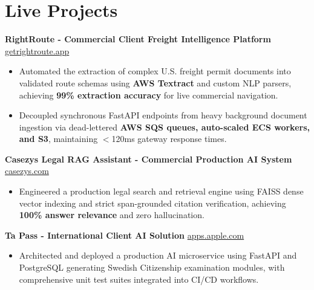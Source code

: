 \documentclass[9.5pt,a4paper]{article}
\begin{document}
\section*{Live Projects}
\noindent
\textbf{RightRoute - Commercial Client Freight Intelligence Platform} \hfill \href{https://getrightroute.app}{getrightroute.app}
\begin{itemize}
    \item Automated the extraction of complex U.S. freight permit documents into validated route schemas using \textbf{AWS Textract} and custom NLP parsers, achieving \textbf{99\% extraction accuracy} for live commercial navigation.
    \item Decoupled synchronous FastAPI endpoints from heavy background document ingestion via dead-lettered \textbf{AWS SQS queues, auto-scaled ECS workers, and S3}, maintaining $<$120ms gateway response times.
\end{itemize}
\vspace{0.6pt}
\noindent
\textbf{Casezys Legal RAG Assistant - Commercial Production AI System} \hfill \href{https://casezys.com}{casezys.com}
\begin{itemize}
    \item Engineered a production legal search and retrieval engine using FAISS dense vector indexing and strict span-grounded citation verification, achieving \textbf{100\% answer relevance} and zero hallucination.
\end{itemize}
\vspace{0.6pt}
\noindent
\textbf{Ta Pass - International Client AI Solution} \hfill \href{https://apps.apple.com/us/app/ta-pass-swedish-citizenship/id6799644651}{apps.apple.com}
\begin{itemize}
    \item Architected and deployed a production AI microservice using FastAPI and PostgreSQL generating Swedish Citizenship examination modules, with comprehensive unit test suites integrated into CI/CD workflows.
\end{itemize}
\vspace{0.6pt}
\end{document}
